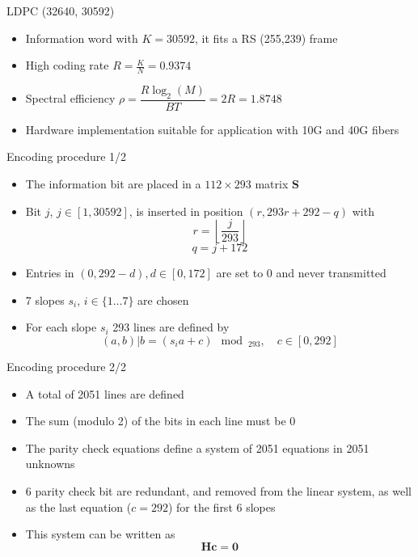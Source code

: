 \documentclass[pdf]
          {beamer}
\begin{document}
\begin{frame}{LDPC (32640, 30592)}
	\begin{itemize}
		\item Information word with $K=30592$, it fits a RS (255,239) frame
		\item High coding rate $R = \frac{K}{N} = 0.9374$
		\item Spectral efficiency $\rho = \dfrac{R \log_2(M)}{BT} = 2R = 1.8748$
		\item Hardware implementation suitable for application with 10G and 40G fibers
	\end{itemize}
	
\end{frame}

\begin{frame}{Encoding procedure 1/2}
	\begin{itemize}
		\item The information bit are placed in a $112\times 293$ matrix $\mathbf{S}$
		\item Bit $j$, $j\in[1, 30592]$, is inserted in position $(r, 293r + 292 - q)$ with
		\begin{equation*}
			r = \left\lfloor\dfrac{j}{293}\right\rfloor
		\end{equation*}
		\begin{equation*}
			q = j + 172
		\end{equation*}
		\item Entries in $(0, 292-d), d \in [0, 172]$ are set to 0 and never transmitted
		\item 7 slopes $s_i, \, i \in \{1 \dots 7\}$ are chosen
		\item For each slope $s_i$ 293 lines are defined by
		\begin{equation*}
			(a, b) | b = (s_ia + c)\mod_{293}, \quad c \in [0, 292]
		\end{equation*}
	\end{itemize}
\end{frame}

\begin{frame}{Encoding procedure 2/2}
	\begin{itemize}
		\item A total of 2051 lines are defined
		\item The sum (modulo 2) of the bits in each line must be 0
		\item The parity check equations define a system of 2051 equations in 2051 unknowns
		\item 6 parity check bit are redundant, and removed from the linear system, as well as the last equation ($c=292$) for the first 6 slopes
		\item This system can be written as 
		\begin{equation*}
			\mathbf{H} \mathbf{c} = \mathbf{0}
		\end{equation*}
	\end{itemize}
\end{frame}
\end{document}
